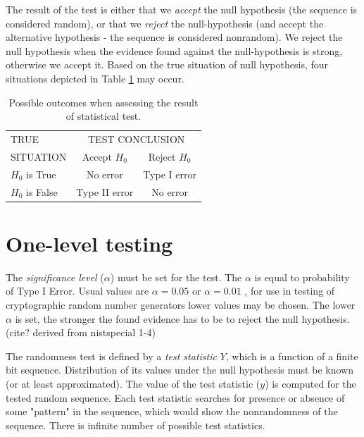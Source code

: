 \documentclass[
  digital,     %
  oneside,     %
  nosansbold,  %
  nocolorbold, %
  nolof,         %
  nolot,         %
]{fithesis4}
\begin{document}


The result of the test is either that we \emph{accept} the null hypothesis (the sequence is considered random), or that we \emph{reject} the null-hypothesis (and accept the alternative hypothesis - the sequence is considered nonrandom). We reject the null hypothesis when the evidence found against the null-hypothesis is strong, otherwise we accept it. Based on the true situation of null hypothesis, four situations depicted in Table \ref{tab:type_errors} may occur. \cite[p. 417]{basic_practice}

\begin{table}
  \begin{tabularx}{0.7\textwidth}{l|c|c}
    TRUE  & \multicolumn{2}{c}{TEST CONCLUSION}\\
    SITUATION &Accept $H_0$ & Reject $H_0$\\
    \midrule
    $H_0$ is True &  No error & Type I error  \\
    $H_0$ is False & Type II error & No error \\
  \end{tabularx}
  \caption{Possible outcomes when assessing the result of statistical test.}
  \label{tab:type_errors}
\end{table}

\section{One-level testing}


The \emph{significance level} ($\alpha$) must be set for the test. The $\alpha$ is equal to probability of Type I Error. Usual values are $\alpha = 0.05$ or $\alpha = 0.01$ \cite[p. 390]{basic_practice}, for use in testing of cryptographic random number generators lower values may be chosen. \cite[p. 1-4]{nist_special} The lower $\alpha$ is set, the stronger the found evidence has to be to reject the null hypothesis. (cite? derived from nistspecial 1-4)


The randomness test is defined by a \emph{test statistic} $Y$, which is a function of a finite bit sequence. Distribution of its values under the null hypothesis must be known (or at least approximated). The value of the test statistic ($y$) is computed for the tested random sequence. Each test statistic searches for presence or absence of some "pattern" in the sequence, which would show the nonrandomness of the sequence. There is infinite number of possible test statistics. \cite[p. 4]{tu01_paper}
\end{document}
